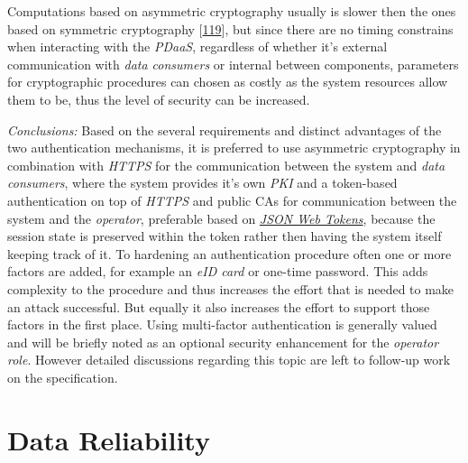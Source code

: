 \documentclass[12pt,english,a4paper,titlepage,cleardoublepage=empty,dottedtoc]{report}
\begin{document}
Computations based on asymmetric cryptography usually is slower then the
ones based on symmetric cryptography
{[}\protect\hyperlink{ref-book_2014_chapter-10-5-asym-random-number-gen}{119}{]},
but since there are no timing constrains when interacting with the
\emph{PDaaS}, regardless of whether it's external communication with
\emph{data consumers} or internal between components, parameters for
cryptographic procedures can chosen as costly as the system resources
allow them to be, thus the level of security can be increased.

\emph{Conclusions:} Based on the several requirements and distinct
advantages of the two authentication mechanisms, it is preferred to use
asymmetric cryptography in combination with \emph{HTTPS} for the
communication between the system and \emph{data consumers}, where the
system provides it's own \emph{PKI} and a token-based authentication on
top of \emph{HTTPS} and public CAs for communication between the system
and the \emph{operator}, preferable based on
\emph{\protect\hyperlink{link_jwt}{JSON Web Tokens}}, because the
session state is preserved within the token rather then having the
system itself keeping track of it. To hardening an authentication
procedure often one or more factors are added, for example an \emph{eID
card} or one-time password. This adds complexity to the procedure and
thus increases the effort that is needed to make an attack successful.
But equally it also increases the effort to support those factors in the
first place. Using multi-factor authentication is generally valued and
will be briefly noted as an optional security enhancement for the
\emph{operator role}. However detailed discussions regarding this topic
are left to follow-up work on the specification.

\section{Data Reliability}\label{data-reliability}
\end{document}
